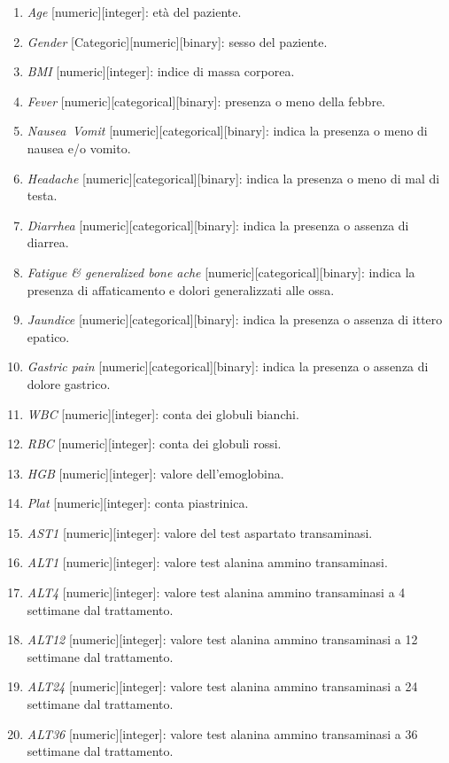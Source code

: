 \documentclass[italian,12pt,a4paper]{article}
\begin{document}
   \begin{enumerate}
    \item \textit{Age} [numeric][integer]: età del paziente.
    \item \textit{Gender} [Categoric][numeric][binary]: sesso del paziente.
    \item \textit{BMI} [numeric][integer]: indice di massa corporea.
    \item \textit{Fever} [numeric][categorical][binary]: presenza o meno della febbre.
    \item \textit{Nausea\ Vomit} [numeric][categorical][binary]: indica la presenza o meno di nausea e/o vomito.
    \item \textit{Headache} [numeric][categorical][binary]: indica la presenza o meno di mal di testa.
    \item \textit{Diarrhea} [numeric][categorical][binary]: indica la presenza o assenza di diarrea.
    \item \textit{Fatigue \& generalized bone ache} [numeric][categorical][binary]: indica la presenza di affaticamento e dolori generalizzati alle ossa.
    \item \textit{Jaundice} [numeric][categorical][binary]: indica la presenza o assenza di ittero epatico.
    \item \textit{Gastric pain} [numeric][categorical][binary]: indica la presenza o assenza di dolore gastrico.
    \item \textit{WBC} [numeric][integer]: conta dei globuli bianchi.
    \item \textit{RBC} [numeric][integer]: conta dei globuli rossi.
    \item \textit{HGB} [numeric][integer]: valore dell'emoglobina.
    \item \textit{Plat} [numeric][integer]: conta piastrinica.
    \item \textit{AST1} [numeric][integer]: valore del test aspartato transaminasi.
    \item \textit{ALT1} [numeric][integer]: valore test alanina ammino transaminasi.
    \item \textit{ALT4} [numeric][integer]: valore test alanina ammino transaminasi a 4 settimane dal trattamento.
    \item \textit{ALT12} [numeric][integer]: valore test alanina ammino transaminasi a 12 settimane dal trattamento.
    \item \textit{ALT24} [numeric][integer]: valore test alanina ammino transaminasi a 24 settimane dal trattamento.
    \item \textit{ALT36} [numeric][integer]: valore test alanina ammino transaminasi a 36 settimane dal trattamento.

\end{enumerate}
\end{document}
